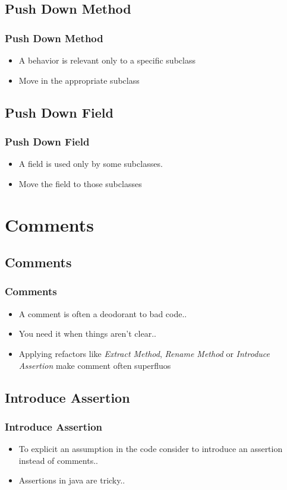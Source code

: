 \documentclass{beamer}
\begin{document}
\subsection{Push Down Method}
\begin{frame}
  \frametitle{Push Down Method}
  \begin{itemize}
	\item<+-> A behavior is relevant only to a specific subclass
	\item<+-> Move in the appropriate subclass
   \end{itemize}
\end{frame}

\subsection{Push Down Field}
\begin{frame}
  \frametitle{Push Down Field}
  \begin{itemize}
	\item<+-> A field is used only by some subclasses.
	\item<+-> Move the field to those subclasses
   \end{itemize}
\end{frame}

\section{Comments}
\subsection{Comments}
\begin{frame}
  \frametitle{Comments}
  \begin{itemize}
	\item<+-> A comment is often a deodorant to bad code..
	\item<+-> You need it when things aren't clear.. 
	\item<+-> Applying refactors like \textit{Extract Method}, \textit{Rename Method} or \textit{Introduce Assertion} make comment often superfluos
   \end{itemize}
\end{frame}

\subsection{Introduce Assertion}
\begin{frame}
  \frametitle{Introduce Assertion}
  \begin{itemize}
	\item<+-> To explicit an assumption in the code consider to introduce an assertion instead of comments..  
	\item<+-> Assertions in java are tricky..
   \end{itemize}
\end{frame}
\end{document}
